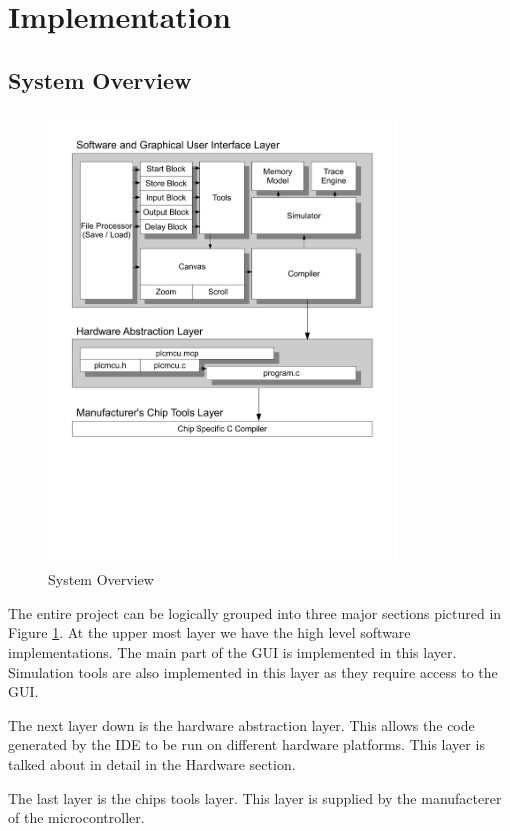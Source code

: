 \section{Implementation}
\subsection{System Overview}
\begin{figure}[htp]
    \centering
    \includegraphics[trim= 0mm 79mm 0mm 16mm, clip, width=350px]{./images/SystemOverview.pdf}
    \caption{System Overview}
    \label{fig:SystemOverview}
\end{figure}

The entire project can be logically grouped into three major sections pictured in Figure \ref{fig:SystemOverview}. At the upper most layer we have the high level software implementations. The main part of the GUI is implemented in this layer. Simulation tools are also implemented in this layer as they require access to the GUI.

The next layer down is the hardware abstraction layer. This allows the code generated by the IDE to be run on different hardware platforms. This layer is talked about in detail in the Hardware section.

The last layer is the chips tools layer. This layer is supplied by the manufacterer of the microcontroller.


